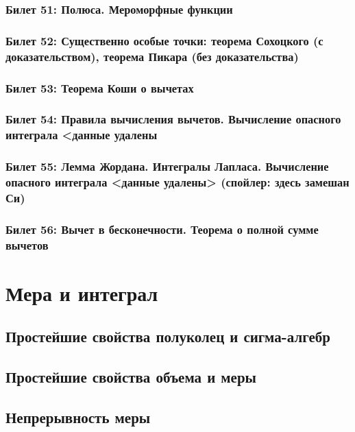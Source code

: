 \documentclass[12pt, a4paper, oneside]{memoir}
\begin{document}
\subsection{Билет 51: Полюса. Мероморфные функции}

\subsection{Билет 52: Существенно особые точки: теорема Сохоцкого (с доказательством), теорема Пикара (без доказательства)}

\subsection{Билет 53: Теорема Коши о вычетах}

\subsection{Билет 54: Правила вычисления вычетов. Вычисление опасного интеграла <данные удалены}

\subsection{Билет 55: Лемма Жордана. Интегралы Лапласа. Вычисление опасного интеграла <данные удалены> (спойлер: здесь замешан Си)}

\subsection{Билет 56: Вычет в бесконечности. Теорема о полной сумме вычетов}






\chapter{Мера и интеграл}


\section{Простейшие свойства полуколец и сигма-алгебр}
\section{Простейшие свойства объема и меры}
\section{Непрерывность меры}
\end{document}
